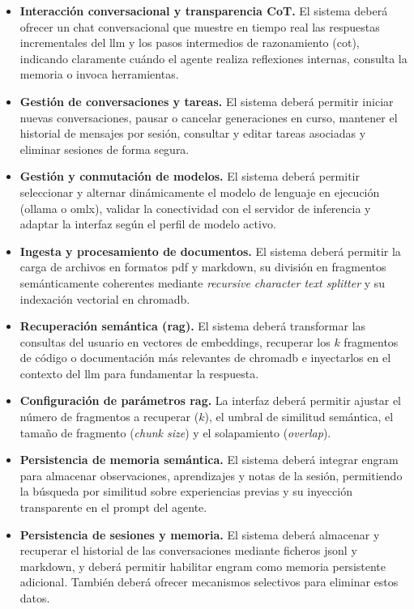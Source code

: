 \begin{itemize}
    \item[\textbf{RF1.}] \textbf{Interacción conversacional y transparencia CoT.} El sistema deberá ofrecer un chat conversacional que muestre en tiempo real las respuestas incrementales del \gls{llm} y los pasos intermedios de razonamiento (\gls{cot}), indicando claramente cuándo el agente realiza reflexiones internas, consulta la memoria o invoca herramientas.
    \item[\textbf{RF2.}] \textbf{Gestión de conversaciones y tareas.} El sistema deberá permitir iniciar nuevas conversaciones, pausar o cancelar generaciones en curso, mantener el historial de mensajes por sesión, consultar y editar tareas asociadas y eliminar sesiones de forma segura.
    \item[\textbf{RF3.}] \textbf{Gestión y conmutación de modelos.} El sistema deberá permitir seleccionar y alternar dinámicamente el modelo de lenguaje en ejecución (\gls{ollama} o \gls{omlx}), validar la conectividad con el servidor de inferencia y adaptar la interfaz según el perfil de modelo activo.
    \item[\textbf{RF4.}] \textbf{Ingesta y procesamiento de documentos.} El sistema deberá permitir la carga de archivos en formatos \gls{pdf} y \gls{markdown}, su división en fragmentos semánticamente coherentes mediante \textit{recursive character text splitter} y su indexación vectorial en \gls{chromadb}.
    \item[\textbf{RF5.}] \textbf{Recuperación semántica (\gls{rag}).} El sistema deberá transformar las consultas del usuario en vectores de \gls{embeddings}, recuperar los $k$ fragmentos de código o documentación más relevantes de \gls{chromadb} e inyectarlos en el contexto del \gls{llm} para fundamentar la respuesta.
    \item[\textbf{RF6.}] \textbf{Configuración de parámetros \gls{rag}.} La interfaz deberá permitir ajustar el número de fragmentos a recuperar ($k$), el umbral de similitud semántica, el tamaño de fragmento (\textit{chunk size}) y el solapamiento (\textit{overlap}).
    \item[\textbf{RF7.}] \textbf{Persistencia de memoria semántica.} El sistema deberá integrar \gls{engram} para almacenar observaciones, aprendizajes y notas de la sesión, permitiendo la búsqueda por similitud sobre experiencias previas y su inyección transparente en el \gls{prompt} del agente.
    \item[\textbf{RF8.}] \textbf{Persistencia de sesiones y memoria.} El sistema deberá almacenar y recuperar el historial de las conversaciones mediante ficheros \gls{jsonl} y \gls{markdown}, y deberá permitir habilitar \gls{engram} como memoria persistente adicional. También deberá ofrecer mecanismos selectivos para eliminar estos datos.

\end{itemize}
